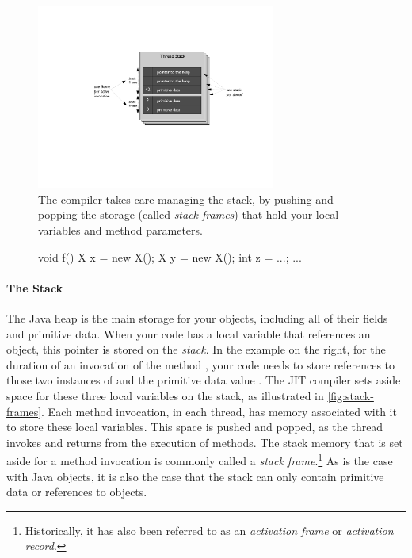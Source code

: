 
\begin{figure}
\centering
\includegraphics[width=0.7\textwidth]{part2/Figures/lifetime/heaps_and_stacks_stack_frames}
\caption{The compiler takes care managing the stack, by pushing and popping
the storage (called \emph{stack frames}) that hold your local variables and
method parameters.}
\label{fig:stack-frames}
\end{figure}

\begin{figure}
\centering
\vspace{-3mm}
\begin{framedlisting}
void f() {
   X x = new X();
   X y = new X();
   int z = ...;
   ...
}
\end{framedlisting}
\end{figure}
\paragraph{The Stack}
The Java heap is the main storage for your objects, including all of their
fields and primitive data. When your code has a local variable that references
an object, this pointer is stored on the \emph{stack}. In the example on the
right, for the duration of an invocation of the method , your code needs
to store references to those two instances of  and the primitive data
value . The JIT compiler sets aside space for these three local
variables on the stack, as illustrated in \autoref{fig:stack-frames}.  Each
method invocation, in each thread, has memory associated with it to store these
local variables. This space is pushed and popped, as the thread invokes and
returns from the execution of methods. The stack memory that is set aside for a
method invocation is commonly called a \emph{stack frame}.\footnote{Historically, it has also been referred to as an
\emph{activation frame} or \emph{activation record}.} As is the case with Java objects, it is also
the case that the stack can only contain primitive data or references to
objects.

